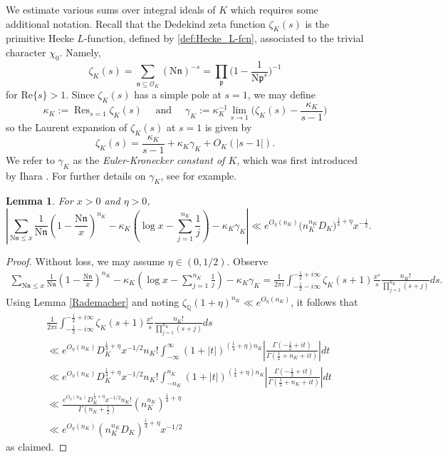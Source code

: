 \documentclass[12pt,psamsfonts]{amsart}
\newtheorem{lem}[thm]{Lemma}
\theoremstyle{definition}
\theoremstyle{remark}
\numberwithin{equation}{section}
\newcounter{notation}
\theoremstyle{plain}
\theoremstyle{remark}
\renewcommand{\1}{ {\bf 1}}
\newcommand{\kn}{\mathfrak{n}}
\newcommand{\N}{\mathrm{N}}
\newcommand{\kp}{\mathfrak{p}}
\newcommand{\cO}{\mathcal{O}}
\newcommand{\Q}{\mathbb{Q}}
\renewcommand{\Re}{\mathrm{Re}}
\def\Res{\mathop{\mathrm{Res}}}
\begin{document}
We estimate various sums over integral ideals of $K$ which requires some additional notation.  Recall that the Dedekind zeta function $\zeta_K(s)$ is the primitive Hecke $L$-function, defined by \eqref{def:Hecke_L-fcn}, associated to the trivial character $\chi_0$. Namely, 
\[
\zeta_K(s) = \sum_{\kn \subseteq\cO_K} (\N\kn)^{-s} = \prod_{\kp}\Big(1-\frac{1}{\N\kp^s} \Big)^{-1}
\]
for $\Re\{s\} > 1$. Since $\zeta_K(s)$ has a simple pole at $s=1$, we may define
\begin{equation}
\kappa_K := \Res_{s=1} \zeta_K(s) \quad \text{ and } \quad \gamma_K := \kappa_K^{-1} \lim_{s \rightarrow 1} \Big( \zeta_K(s) - \frac{\kappa_K}{s-1} \Big)
\label{def:Zeta_Laurent}
\end{equation}
so the Laurent expansion of $\zeta_K(s)$ at $s=1$ is given by 
\[
\zeta_K(s) =  \frac{\kappa_K}{s-1} + \kappa_K \gamma_K + O_K( |s-1| ).
\]
We refer to $\gamma_K$ as the \emph{Euler-Kronecker constant of $K$}, which was first introduced by Ihara \cite{Ihara}. For further details on $\gamma_K$, see \cite{Ihara,Ihara2,Murty} for example.
\begin{lem}
\label{lem:harmonic_sum}
For $x > 0$ and $\eta > 0$,
\[
\left|\sum_{\mathrm{N}\kn\leq x}\frac{1}{\mathrm{N}\kn}\left(1-\frac{\mathrm{N}\kn}{x}\right)^{n_K}-\kappa_K\left(\log x-\sum_{j=1}^{n_K} \frac{1}{j}\right)-\kappa_K\gamma_K\right|\ll e^{O_{\eta}(n_K)} \big( n_K^{n_K} D_K \big)^{\tfrac{1}{4}+\eta} x^{-\frac{1}{2}}.
\]
\end{lem}
\begin{proof}
Without loss, we may assume $\eta \in (0,1/2)$. Observe
{\small
\begin{align*}
\sum_{\mathrm{N}\kn\leq x}\frac{1}{\mathrm{N}\kn}\left(1-\frac{\mathrm{N}\kn}{x}\right)^{n_K}-\kappa_K\left(\log x-\sum_{j=1}^{n_K} \frac{1}{j}\right)-\kappa_K\gamma_K=\frac{1}{2\pi i}\int_{-\frac{1}{2}-i\infty}^{-\frac{1}{2}+i\infty}\zeta_K(s+1)\frac{x^s}{s}\frac{n_K!}{\prod_{j=1}^{n_K} (s+j)}ds.
\end{align*}}%
Using Lemma \ref{Rademacher} and noting $\zeta_{\Q}(1+\eta)^{n_K} \ll e^{O_{\eta}(n_K)}$, it follows that
\begin{align*}
&\frac{1}{2\pi i}\int_{-\frac{1}{2}-i\infty}^{-\frac{1}{2}+i\infty}\zeta_K(s+1)\frac{x^s}{s}\frac{n_K!}{\prod_{j=1}^{n_K} (s+j)}ds\\
&\ll e^{O_{\eta}(n_K)} D_{K}^{\frac{1}{4} +\eta}x^{-1/2}n_K!\int_{-\infty}^{\infty}(1+|t|)^{(\frac{1}{4}+\eta)n_K}\left|\frac{\Gamma(-\frac{1}{2}+it)}{\Gamma(\frac{1}{2}+n_K+it)}\right|dt\\
&\ll e^{O_{\eta}(n_K)}D_{K}^{\frac{1}{4}+\eta}x^{-1/2}n_K!\int_{-n_K}^{n_K}(1+|t|)^{(\frac{1}{4}+\eta)n_K}\left|\frac{\Gamma(-\frac{1}{2}+it)}{\Gamma(\frac{1}{2}+n_K+it)}\right|dt\\
&\ll \frac{e^{O_{\eta}	(n_K)}  D_{K}^{\frac{1}{4}+\eta}x^{-1/2}n_K!}{\Gamma(n_K+\frac{1}{2})} (n_K^{n_K})^{\frac{1}{4}+\eta} \\
&\ll e^{O_{\eta}(n_K)} (n_K^{n_K}D_{K})^{\frac{1}{4}+\eta}x^{-1/2} 
\end{align*} 
as claimed.
\end{proof}
\end{document}
